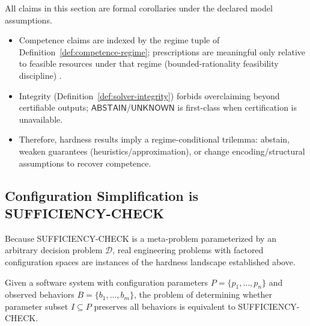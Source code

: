 \begin{remark}
All claims in this section are formal corollaries under the declared model assumptions.
\begin{itemize}
\item Competence claims are indexed by the regime tuple of Definition~\ref{def:competence-regime}; prescriptions are meaningful only relative to feasible resources under that regime (bounded-rationality feasibility discipline) \cite{sep_bounded_rationality,arora2009computational}.
\item Integrity (Definition~\ref{def:solver-integrity}) forbids overclaiming beyond certifiable outputs; $\mathsf{ABSTAIN}$/$\mathsf{UNKNOWN}$ is first-class when certification is unavailable.
\item Therefore, hardness results imply a regime-conditional trilemma: abstain, weaken guarantees (heuristics/approximation), or change encoding/structural assumptions to recover competence.
\end{itemize}
\end{remark}

\subsection{Configuration Simplification is SUFFICIENCY-CHECK}

Because SUFFICIENCY-CHECK is a meta-problem parameterized by an arbitrary decision problem $\mathcal{D}$, real engineering problems with factored configuration spaces are instances of the hardness landscape established above.

\begin{theorem}
\label{thm:config-reduction}
Given a software system with configuration parameters $P = \{p_1, \ldots, p_n\}$ and observed behaviors $B = \{b_1, \ldots, b_m\}$, the problem of determining whether parameter subset $I \subseteq P$ preserves all behaviors is equivalent to SUFFICIENCY-CHECK.
\end{theorem}

